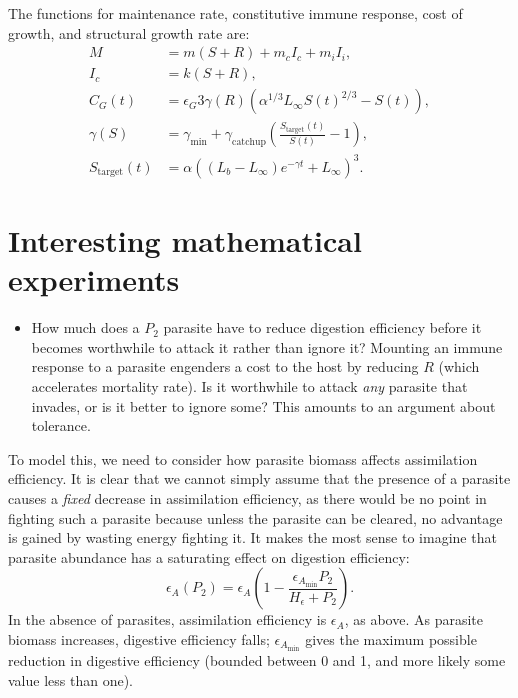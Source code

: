 \documentclass[12pt,reqno,final,pdftex]{amsart}\usepackage[]{graphicx}\usepackage[]{color}
\theoremstyle{plain}
\numberwithin{equation}{part}
\begin{document}
The functions for maintenance rate, constitutive immune response, cost of growth, and structural growth rate are:
\begin{align}
M &= m(S+R)+m_cI_c+m_iI_i, \\
I_c &= k(S + R), \\
C_G(t)&=\epsilon_G 3\gamma(R) \left(\alpha^{1/3}L_{\infty }S(t)^{2/3}-S(t)\right), \\
\gamma(S) &=\gamma _{\min}+\gamma_{\text{catchup}}\left(\frac{S_{\text{target}}(t)}{S(t)}-1\right), \\
S_{\text{target}}(t) &= \alpha \left(\left(L_b-L_{\infty }\right) e^{-\gamma  t}+L_{\infty }\right)^3.
\end{align}




\section*{Interesting mathematical experiments}
\begin{itemize}
\item How much does a $P_2$ parasite have to reduce digestion efficiency before it becomes worthwhile to attack it rather than ignore it? Mounting an immune response to a parasite engenders a cost to the host by reducing $R$ (which accelerates mortality rate). Is it worthwhile to attack \emph{any} parasite that invades, or is it better to ignore some? This amounts to an argument about tolerance.
\end{itemize}

To model this, we need to consider how parasite biomass affects assimilation efficiency.
It is clear that we cannot simply assume that the presence of a parasite causes a \emph{fixed} decrease in assimilation efficiency, as there would be no point in fighting such a parasite because unless the parasite can be cleared, no advantage is gained by wasting energy fighting it.
It makes the most sense to imagine that parasite abundance has a saturating effect on digestion efficiency:
\begin{equation}
\epsilon_A(P_2) = \epsilon_A\left(1 - \frac{\epsilon_{A_{\min}} P_2}{H_\epsilon + P_2}\right).
\end{equation}
In the absence of parasites, assimilation efficiency is $\epsilon_A$, as above.
As parasite biomass increases, digestive efficiency falls; $\epsilon_{A_{\min}}$ gives the maximum possible reduction in digestive efficiency (bounded between 0 and 1, and more likely some value less than one).
\end{document}
